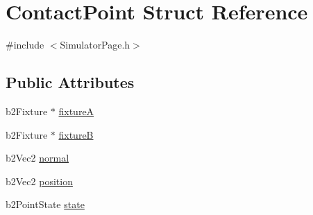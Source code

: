 \hypertarget{structContactPoint}{\section{Contact\-Point Struct Reference}
\label{structContactPoint}
}


{\ttfamily \#include $<$Simulator\-Page.\-h$>$}

\subsection*{Public Attributes}
\begin{DoxyCompactItemize}
\item 
b2\-Fixture $\ast$ \hyperlink{structContactPoint_ae0abe83cac1d16a0251c00eec2fdd9a8}{fixture\-A}
\item 
b2\-Fixture $\ast$ \hyperlink{structContactPoint_a79157784afc39cf079438567b32e1612}{fixture\-B}
\item 
b2\-Vec2 \hyperlink{structContactPoint_a41bc30994cbefb7c33ed08fc5196a56e}{normal}
\item 
b2\-Vec2 \hyperlink{structContactPoint_a4fb05c387ebf7e3d0a44c7655b5dd6b5}{position}
\item 
b2\-Point\-State \hyperlink{structContactPoint_a1b95214f8bd0f1e8ceb4a990dd1b8cc4}{state}
\end{DoxyCompactItemize}


